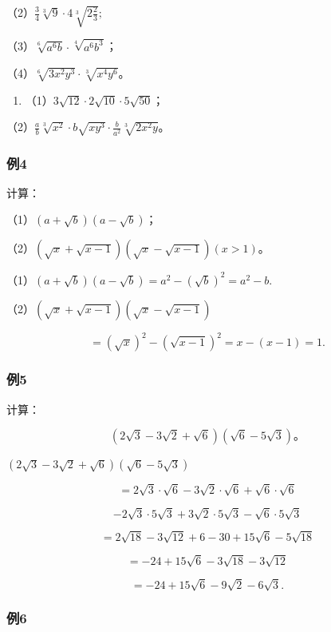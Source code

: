 （2）\(\frac{3}{4}\sqrt[3]{9} \cdot 4\sqrt[3]{2\frac{2}{3}};\)

（3）\(\sqrt[6]{a^6b} \cdot \sqrt[4]{a^6b^3}\)；

（4）\(\sqrt[6]{3x^2y^3} \cdot \sqrt[3]{x^4y^6}\)。

\begin{enumerate}[start=5]
\item
  （1）\(3\sqrt{12} \cdot 2\sqrt{10} \cdot 5\sqrt{50}\)；
\end{enumerate}

（2）\(\frac{a}{b}\sqrt[3]{x^2} \cdot b\sqrt{xy^3} \cdot \frac{b}{a^2}\sqrt[3]{2x^2y}\)。

\subsubsection{例4}

计算：

（1）\((a + \sqrt{b})(a - \sqrt{b})\)；

（2）\((\sqrt{x} + \sqrt{x - 1})(\sqrt{x} - \sqrt{x - 1})(x > 1)\)。

（1）\((a + \sqrt{b})(a - \sqrt{b}) = a^2 - (\sqrt{b})^2 = a^2 - b.\)

（2）\((\sqrt{x} + \sqrt{x - 1})(\sqrt{x} - \sqrt{x - 1})\)

\[
= (\sqrt {x}) ^ {2} - (\sqrt {x - 1}) ^ {2} = x - (x - 1) = 1.
\]

\subsubsection{例5}

计算：

\[
(2 \sqrt {3} - 3 \sqrt {2} + \sqrt {6}) (\sqrt {6} - 5 \sqrt {3})\text{。}
\]

\((2\sqrt{3} - 3\sqrt{2} + \sqrt{6})(\sqrt{6} - 5\sqrt{3})\)

\[
= 2 \sqrt {3} \cdot \sqrt {6} - 3 \sqrt {2} \cdot \sqrt {6} + \sqrt {6} \cdot \sqrt {6}
\]

\[
- 2 \sqrt {3} \cdot 5 \sqrt {3} + 3 \sqrt {2} \cdot 5 \sqrt {3} - \sqrt {6} \cdot 5 \sqrt {3}
\]

\[
= 2 \sqrt {18} - 3 \sqrt {12} + 6 - 30 + 15 \sqrt {6} - 5 \sqrt {18}
\]

\[
= - 24 + 15 \sqrt {6} - 3 \sqrt {18} - 3 \sqrt {12}
\]

\[
= - 24 + 15 \sqrt {6} - 9 \sqrt {2} - 6 \sqrt {3}.
\]

\subsubsection{例6}

